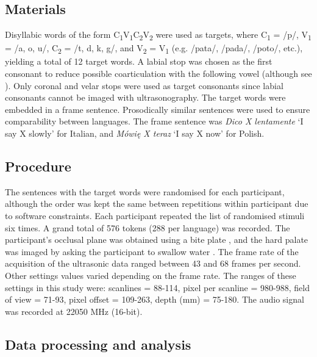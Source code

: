 \documentclass[authoryear, twocolumn]{elsarticle}
\begin{document}
\subsection{Materials}\label{materials}

Disyllabic words of the form
C\textsubscript{1}V\textsubscript{1}C\textsubscript{2}V\textsubscript{2}
were used as targets, where C\textsubscript{1} = /p/, V\textsubscript{1}
= /a, o, u/, C\textsubscript{2} = /t, d, k, g/, and V\textsubscript{2} =
V\textsubscript{1} (e.g. /pata/, /pada/, /poto/, etc.), yielding a total
of 12 target words. A labial stop was chosen as the first consonant to
reduce possible coarticulation with the following vowel (although see
\citealt{vazquez-alvarez2007}). Only coronal and velar stops were used
as target consonants since labial consonants cannot be imaged with
ultrasonography. The target words were embedded in a frame sentence.
Prosodically similar sentences were used to ensure comparability between
languages. The frame sentence was \emph{Dico X lentamente} `I say X
slowly' for Italian, and \emph{Mówię X teraz} `I say X now' for Polish.

\subsection{Procedure}\label{procedure}

The sentences with the target words were randomised for each
participant, although the order was kept the same between repetitions
within participant due to software constraints. Each participant
repeated the list of randomised stimuli six times. A grand total of 576
tokens (288 per language) was recorded. The participant's occlusal plane
was obtained using a bite plate \citep{scobbie2011}, and the hard palate
was imaged by asking the participant to swallow water
\citep{epstein2005}. The frame rate of the acquisition of the ultrasonic
data ranged between 43 and 68 frames per second. Other settings values
varied depending on the frame rate. The ranges of these settings in this
study were: scanlines = 88-114, pixel per scanline = 980-988, field of
view = 71-93, pixel offset = 109-263, depth (mm) = 75-180. The audio
signal was recorded at 22050 MHz (16-bit).

\subsection{Data processing and
analysis}\label{data-processing-and-analysis}
\end{document}

